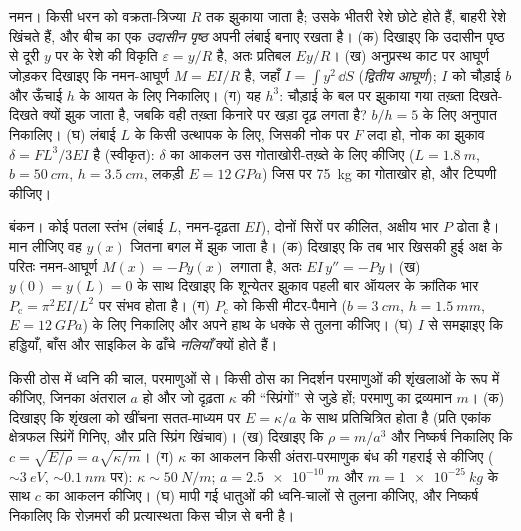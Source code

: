 \begin{exercise}[$\star\star\star$]\label{exo:b3:continuum-elasticity:10}
नमन। किसी धरन को वक्रता-त्रिज्या $R$ तक झुकाया जाता है; उसके भीतरी
रेशे छोटे होते हैं, बाहरी रेशे खिंचते हैं, और बीच का एक
\emph{उदासीन पृष्ठ} अपनी लंबाई बनाए रखता है। (क) दिखाइए कि उदासीन
पृष्ठ से दूरी $y$ पर के रेशे की विकृति $\varepsilon = y/R$ है, अतः
प्रतिबल $Ey/R$।
(ख) अनुप्रस्थ काट पर आघूर्ण जोड़कर दिखाइए कि नमन-आघूर्ण
$M = EI/R$ है, जहाँ $I = \int y^2\,\dd S$ (\emph{द्वितीय आघूर्ण});
$I$ को चौड़ाई $b$ और ऊँचाई $h$ के आयत के लिए निकालिए। (ग) यह
$h^3$: चौड़ाई के बल पर झुकाया गया तख़्ता दिखते-दिखते क्यों झुक जाता है,
जबकि वही तख़्ता किनारे पर खड़ा दृढ़ लगता है? $b/h = 5$ के लिए अनुपात
निकालिए। (घ) लंबाई $L$ के किसी उत्थापक के लिए, जिसकी नोक पर $F$ लदा हो,
नोक का झुकाव $\delta = FL^3/3EI$ है (स्वीकृत): $\delta$ का आकलन उस
गोताखोरी-तख़्ते के लिए कीजिए
($L = \qty{1.8}{m}$, $b = \qty{50}{cm}$, $h = \qty{3.5}{cm}$, लकड़ी $E
= \qty{12}{GPa}$) जिस पर \qty{75}{kg} का गोताखोर हो, और टिप्पणी कीजिए।
\end{exercise}

\begin{exercise}[$\star\star\star$]\label{exo:b3:continuum-elasticity:11}
बंकन। कोई पतला स्तंभ (लंबाई $L$, नमन-दृढ़ता $EI$),
दोनों सिरों पर कीलित, अक्षीय भार $P$ ढोता है। मान लीजिए वह
$y(x)$ जितना बगल में झुक जाता है। (क) दिखाइए कि तब भार खिसकी हुई अक्ष के
परितः नमन-आघूर्ण $M(x) = -Py(x)$ लगाता है, अतः $EI\,y'' = -Py$। (ख)
$y(0) = y(L) = 0$ के साथ दिखाइए कि शून्येतर झुकाव पहली बार ऑयलर के
क्रांतिक भार
$P_{\text{c}} = \pi^2EI/L^2$ पर संभव होता है। (ग) $P_{\text{c}}$ को किसी मीटर-पैमाने
($b = \qty{3}{cm}$, $h = \qty{1.5}{mm}$, $E = \qty{12}{GPa}$) के लिए
निकालिए और अपने हाथ के धक्के से तुलना कीजिए। (घ)
$I$ से समझाइए कि हड्डियाँ, बाँस और साइकिल के ढाँचे \emph{नलियाँ} क्यों होते हैं।
\end{exercise}

\begin{exercise}[$\star\star\star$]\label{exo:b3:continuum-elasticity:12}
किसी ठोस में ध्वनि की चाल, परमाणुओं से। किसी ठोस का निदर्शन परमाणुओं की
शृंखलाओं के रूप में कीजिए, जिनका अंतराल $a$ हो और जो दृढ़ता $\kappa$ की
``स्प्रिंगों'' से जुड़े हों; परमाणु का द्रव्यमान $m$। (क) दिखाइए कि
शृंखला को खींचना सतत-माध्यम  पर $E = \kappa/a$ के साथ प्रतिचित्रित
होता है (प्रति एकांक क्षेत्रफल स्प्रिंगें गिनिए, और प्रति स्प्रिंग
खिंचाव)। (ख) दिखाइए कि $\rho = m/a^3$ और निष्कर्ष निकालिए कि $c =
\sqrt{E/\rho} = a\sqrt{\kappa/m}$। (ग) $\kappa$ का आकलन किसी अंतरा-परमाणुक
बंध की गहराई से कीजिए ($\sim\qty{3}{eV}$, $\sim
\qty{0.1}{nm}$ पर): $\kappa \sim \qty{50}{N/m}$; $a =
\qty{2.5e-10}{m}$ और $m = \qty{1e-25}{kg}$ के साथ $c$ का आकलन
कीजिए। (घ) मापी गई धातुओं की ध्वनि-चालों से तुलना कीजिए, और निष्कर्ष
निकालिए कि रोज़मर्रा की प्रत्यास्थता किस चीज़ से बनी है।
\end{exercise}


